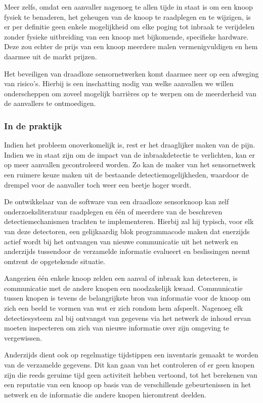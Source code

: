 \documentclass[DIV=calc,paper=a4,fontsize=11pt,twocolumn]{scrartcl}
\newcommand{\heading}[1]{
\vspace{-5mm}
\subsubsection*{#1}
\vspace{-2mm}
}
\begin{document}
Meer zelfs, omdat een aanvaller nagenoeg te allen tijde in staat is om een
knoop fysiek te benaderen, het geheugen van de knoop te raadplegen en te
wijzigen, is er per definitie geen enkele mogelijkheid om elke poging tot
inbraak te verijdelen zonder fysieke uitbreiding van een knoop met bijkomende,
specifieke hardware. Deze zou echter de prijs van een knoop meerdere malen
vermenigvuldigen en hem daarmee uit de markt prijzen.

Het beveiligen van draadloze sensornetwerken komt daarmee neer op een afweging
van risico's. Hierbij is een inschatting nodig van welke aanvallen we willen
onderscheppen om zoveel mogelijk barri\`eres op te werpen om de meerderheid van
de aanvallers te ontmoedigen.

\heading{In de praktijk}

Indien het probleem onoverkomelijk is, rest er het draaglijker maken van de
pijn. Indien we in staat zijn om de impact van de inbraakdetectie te
verlichten, kan er op meer aanvallen gecontroleerd worden. Zo kan de maker van
het sensornetwerk een ruimere keuze maken uit de bestaande
detectiemogelijkheden, waardoor de drempel voor de aanvaller toch weer een
beetje hoger wordt.

De ontwikkelaar van de software van een draadloze sensorknoop kan zelf
onderzoeksliteratuur raadplegen en \'e\'en of meerdere van de beschreven
detectiemechanismen trachten te implementeren. Hierbij zal hij typisch, voor
elk van deze detectoren, een gelijkaardig blok programmacode maken dat
enerzijds actief wordt bij het ontvangen van nieuwe communicatie uit het
netwerk en anderzijds tussendoor de verzamelde informatie evalueert en
beslissingen neemt omtrent de opgetekende situatie.

Aangezien \'e\'en enkele knoop zelden een aanval of inbraak kan detecteren, is
communicatie met de andere knopen een noodzakelijk kwaad. Communicatie tussen
knopen is tevens de belangrijkste bron van informatie voor de knoop om zich een
beeld te vormen van wat er zich rondom hem afspeelt. Nagenoeg elk
detectiesysteem zal bij ontvangst van gegevens via het netwerk de inhoud ervan
moeten inspecteren om zich van nieuwe informatie over zijn omgeving te
vergewissen.

Anderzijds dient ook op regelmatige tijdstippen een inventaris gemaakt te
worden van de verzamelde gegevens. Dit kan gaan van het controleren of er geen
knopen zijn die reeds geruime tijd geen activiteit hebben vertoond, tot het
berekenen van een reputatie van een knoop op basis van de verschillende
gebeurtenissen in het netwerk en de informatie die andere knopen hieromtrent
deelden.
\end{document}

